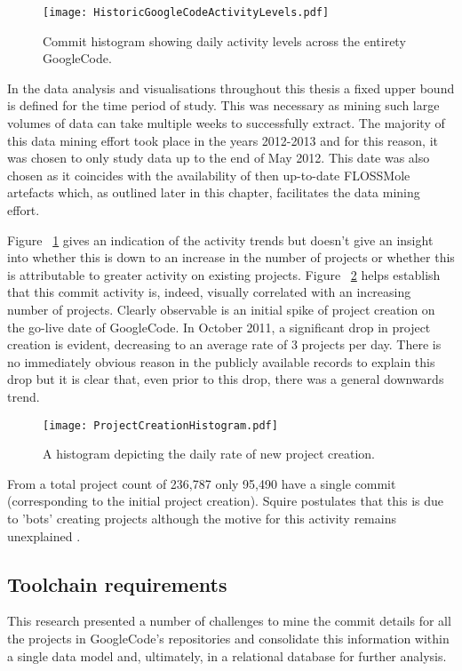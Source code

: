 \begin{figure}[htbp!] 
\centering    
\texttt{[image: HistoricGoogleCodeActivityLevels.pdf]}
\caption{Commit histogram showing daily activity levels across the entirety GoogleCode.}
\label{fig:HistoricGoogleCodeActivityLevels}
\end{figure}

In the data analysis and visualisations throughout this thesis a fixed upper bound is defined for the time period of study. This was necessary as mining such large volumes of data can take multiple weeks to successfully extract. The majority of this data mining effort took place in the years 2012-2013 and for this reason, it was chosen to only study data up to the end of May 2012. This date was also chosen as it coincides with the availability of then up-to-date FLOSSMole artefacts which, as outlined later in this chapter, facilitates the data mining effort.  

Figure ~\ref{fig:HistoricGoogleCodeActivityLevels} gives an indication of the activity trends but doesn't give an insight into whether this is down to an increase in the number of projects or whether this is attributable to greater activity on existing projects. Figure ~\ref{fig:ProjectCreationHistogram} helps establish that this commit activity is, indeed, visually correlated with an increasing number of projects. Clearly observable is an initial spike of project creation on the go-live date of GoogleCode. In October 2011, a significant drop in project creation is evident, decreasing to an average rate of 3 projects per day. There is no immediately obvious reason in the publicly available records to explain this drop but it is clear that, even prior to this drop, there was a general downwards trend.

\begin{figure}[htbp!] 
\centering    
\texttt{[image: ProjectCreationHistogram.pdf]}
\caption{A histogram depicting the daily rate of new project creation.}
\label{fig:ProjectCreationHistogram}
\end{figure}
	
From a total project count of 236,787 only 95,490 have a single commit (corresponding to the initial project creation). Squire postulates that this is due to 'bots' creating projects although the motive for this activity remains unexplained \citep{squire2017lives}.

\subsection{Toolchain requirements}
This research presented a number of challenges to mine the commit details for all the projects in GoogleCode's repositories and consolidate this information within a single data model and, ultimately, in a relational database for further analysis. 

